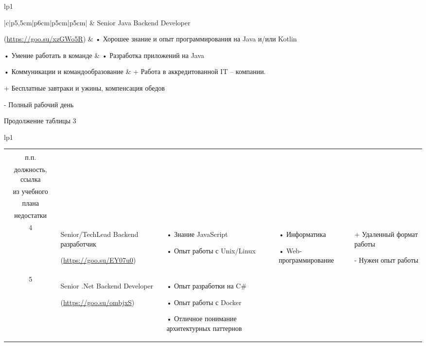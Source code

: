 \documentclass[14pt]{extreport}
\begin{document}
\begin{landscape}
\begin{longtable}[H]{lp{1\linewidth}}
\begin{small}
\begin{tabular}{|c|p{}|p{6cm}|p{5cm}|p{5cm}|}
		& Senior Java Backend Developer
	
(\url{https://goo.su/xzGWo5R}) 	&
•	Хорошее знание и опыт программирования на Java и/или Kotlin

•	Умение работать в команде &
•	Разработка приложений на Java

•	Коммуникации и командообразование &
+	Работа в аккредитованной IT – компании.

+	Бесплатные завтраки и ужины, компенсация обедов

-	Полный рабочий день \\


	\hline


    \end{tabular}
    \end{small}
\end{longtable}

\newpage
Продолжение таблицы 3
\begin{longtable}[H]{lp{1\linewidth}}
\caption{Продолжение таблицы 3}

\centering

\begin{small}


    \begin{tabular}{|c|p{}|p{6cm}|p{5cm}|p{5cm}|}
	\hline 
	\makecell{№ \\ п.п.} &	\makecell{Наименование,\\ должность, ссылка} &	\makecell{Требования} & 	\makecell{Дисциплины \\ из учебного \\плана} &	\makecell{Преимущества и \\недостатки}  \\ 
	\hline 
	4	& Senior/TechLead Backend разработчик
	
(\url{https://goo.su/EY07u0}) &
•	Знание JavaScript

•	Опыт работы с Unix/Linux &
•	Информатика

•	Web-программирование &
+	Удаленный формат работы

-	Нужен опыт работы
\\



	\hline
	5	& Senior .Net Backend Developer
	
(\url{https://goo.su/ombjxS}) &
•	Опыт разработки на C\# 

•	Опыт работы с Docker

•	Отличное понимание архитектурных паттернов 


\end{tabular}
\end{small}
\end{longtable}
\end{landscape}
\end{document}
